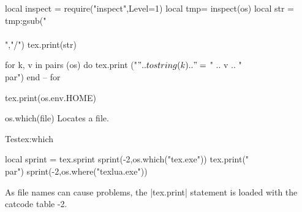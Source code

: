 \parskip=1pt
\begin{luacode}
local inspect = require("inspect",{Level=1})
  local tmp= inspect(os)
  local str = tmp:gsub("\\\\","/")
  tex.print(str)
  
  for k, v in pairs (os) do
    tex.print ("$"..tostring(k).." =$ " .. v .. "\\par")
  end -- for
  
  tex.print(os.env.HOME)
\end{luacode}


\parskip10pt



\begin{docLua}{os.which(file)}
Locates a file.
\end{docLua}

\begin{texexample}{Test}{ex:which}
\begin{luacode}
  local sprint = tex.sprint
  sprint(-2,os.which("tex.exe"))
  tex.print("\\par")
  sprint(-2,os.where("texlua.exe"))
\end{luacode}
\end{texexample}

As file names can cause problems, the |tex.print| statement is loaded with the catcode table -2. 
%
%
%
%
%
%
%


